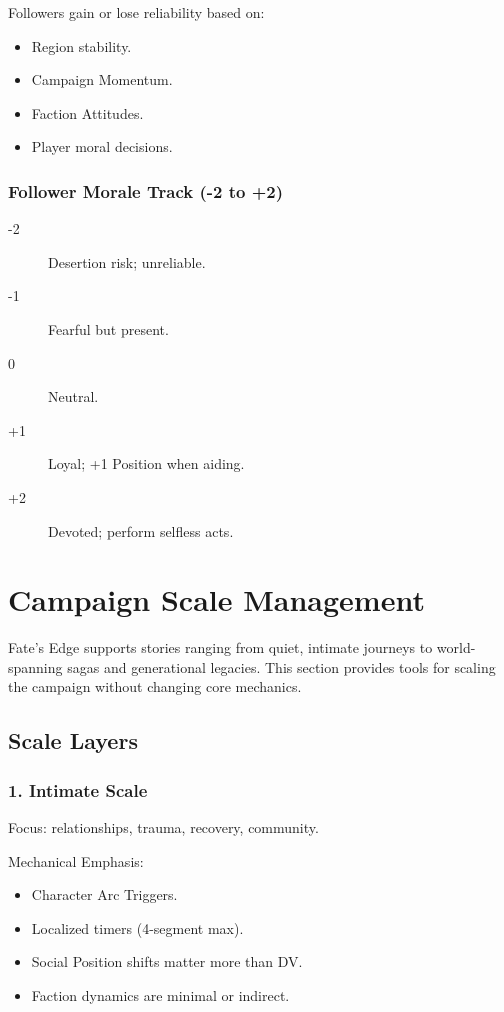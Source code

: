 \documentclass[11pt]{article}
\begin{document}
Followers gain or lose reliability based on:
\begin{itemize}
    \item Region stability.
    \item Campaign Momentum.
    \item Faction Attitudes.
    \item Player moral decisions.
\end{itemize}

\subsubsection{Follower Morale Track (-2 to +2)}
\begin{description}
    \item[-2] Desertion risk; unreliable.
    \item[-1] Fearful but present.
    \item[0] Neutral.
    \item[+1] Loyal; +1 Position when aiding.
    \item[+2] Devoted; perform selfless acts.
\end{description}


\section{Campaign Scale Management}
\label{appendix:campaign-scale}

Fate's Edge supports stories ranging from quiet, intimate journeys to world-spanning sagas 
and generational legacies. This section provides tools for scaling the campaign without 
changing core mechanics.

\subsection{Scale Layers}

\subsubsection{1. Intimate Scale}
Focus: relationships, trauma, recovery, community.

Mechanical Emphasis:
\begin{itemize}
    \item Character Arc Triggers.
    \item Localized timers (4-segment max).
    \item Social Position shifts matter more than DV.
    \item Faction dynamics are minimal or indirect.
\end{itemize}
\end{document}
